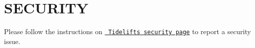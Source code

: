 \chapter{SECURITY}
\hypertarget{md_node__modules_2mquery_2_s_e_c_u_r_i_t_y}{}\label{md_node__modules_2mquery_2_s_e_c_u_r_i_t_y}
Please follow the instructions on \href{https://tidelift.com/docs/security}{\texttt{ Tidelift\textquotesingle{}s security page}} to report a security issue. 